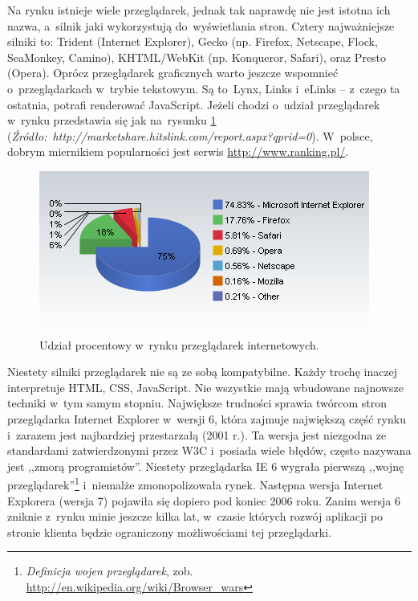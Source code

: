 \documentclass[a4paper,12pt,oneside]{report}
\begin{document}
Na rynku istnieje wiele przeglądarek, jednak tak naprawdę nie jest istotna ich nazwa, a~silnik jaki wykorzystują do~wyświetlania stron. Cztery najważniejsze silniki to: Trident (Internet Explorer), Gecko (np. Firefox, Netscape, Flock, SeaMonkey, Camino), KHTML/WebKit (np. Konqueror, Safari), oraz Presto (Opera). Oprócz przeglądarek graficznych warto jeszcze wspomnieć o~przeglądarkach w~trybie tekstowym. Są to~Lynx, Links i~eLinks -- z~czego ta ostatnia, potrafi renderować JavaScript. Jeżeli chodzi o~udział przeglądarek w~rynku przedstawia się jak na~rysunku \ref{fig:przegladarki} (\emph{Źródło:~http://marketshare.hitslink.com/report.aspx?qprid=0}). W~polsce, dobrym miernikiem popularności jest serwis \url{http://www.ranking.pl/}.
\begin{figure}[h]
  \begin{center}
  \includegraphics{browsers.png}
  \caption{
  Udział procentowy w~rynku przeglądarek internetowych.\label{fig:przegladarki}}
  \end{center}
\end{figure}

Niestety silniki przeglądarek nie są ze sobą kompatybilne. Każdy trochę inaczej interpretuje HTML, CSS, JavaScript. Nie wszystkie mają wbudowane najnowsze techniki w~tym samym stopniu. Największe trudności sprawia twórcom stron przeglądarka Internet Explorer w~wersji 6, która zajmuje największą część rynku i~zarazem jest najbardziej przestarzałą (2001 r.). Ta wersja jest niezgodna ze standardami zatwierdzonymi przez W3C i~posiada wiele błędów, często nazywana jest ,,zmorą programistów''. Niestety przeglądarka IE 6 wygrała pierwszą ,,wojnę przeglądarek''\footnote{\emph{Definicja wojen przeglądarek}, zob. \url{http://en.wikipedia.org/wiki/Browser_wars}} i~niemalże zmonopolizowała rynek. Następna wersja Internet Explorera (wersja 7) pojawiła się dopiero pod koniec 2006 roku. Zanim wersja 6 zniknie z~rynku minie jeszcze kilka lat, w~czasie których rozwój aplikacji po stronie klienta będzie ograniczony możliwościami tej przeglądarki.
\end{document}
